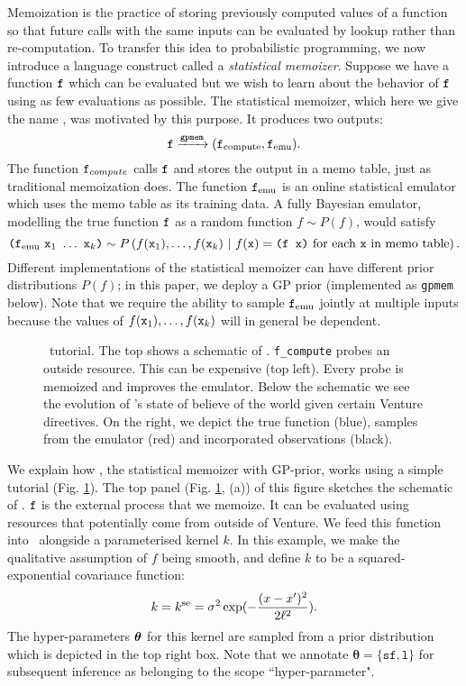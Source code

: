 Memoization is the practice of storing previously computed values of a function so that future calls with the same inputs can be evaluated by lookup rather than re-computation.
To transfer this idea to probabilistic programming, we now introduce a language construct called a
\emph{statistical memoizer}.  Suppose we have a function $\texttt{f}$ which can be evaluated 
but we wish to learn about the behavior of $\texttt{f}$ using as
few evaluations as possible.  The statistical memoizer, which here we give the
name \gpmem, was motivated by this purpose.  It produces two outputs:
\[ \texttt{f} \xrightarrow{\texttt{gpmem}} (\texttt{f}_{\text{compute}}, \texttt{f}_{\textrm{emu}}). \]
The function $\texttt{f}_{compute}$ calls $\texttt{f}$ and stores the output in a memo
table, just as traditional memoization does.  The function $\texttt{f}_{\textrm{emu}}$ is
an online statistical emulator which uses the memo table as its training
data.  A fully Bayesian emulator, modelling the true function $\texttt{f}$ as a
random function $f \sim P(f)$, would satisfy
\[
\texttt{(}\ftt_\emu\ \xtt_1\ \ldots\ \xtt_k\texttt{)}
\sim
P\pn{
  f(\xtt_1), \ldots, f(\xtt_k)
  \mvert
  \text{$f(\xtt) = \texttt{(f x)}$ for each $\xtt$ in memo table}
}.
\]
Different implementations of the statistical memoizer can have
different prior distributions $P(f)$; in this paper, we deploy a \ac{GP} 
prior (implemented as \texttt{gpmem} below).  Note that we require the ability
to sample $\texttt{f}_{\textrm{emu}}$ jointly at multiple inputs because the values of
$f(\texttt{x}_1),\ldots,f(\texttt{x}_k)$ will in general be dependent.


\begin{figure}
\noindent
\captionsetup{aboveskip=-3pt}
\caption{\footnotesize \gpmem\ tutorial. The top shows a schematic of \gpmem.
  \texttt{f\_compute} probes an outside resource.
  This can be expensive (top left).
  Every probe is memoized and improves the emulator. Below the schematic we see the evolution
  of \gpmem's state of believe of the world given certain Venture
  directives. On the right, we depict the true function (blue), samples from the
emulator (red) and incorporated observations (black).}
\label{fig:gpmem_tutorial}
\end{figure}

We explain how \gpmem, the statistical memoizer with \ac{GP}-prior, works using a simple tutorial
(Fig. \ref{fig:gpmem_tutorial}). 
The top panel (Fig. \ref{fig:gpmem_tutorial}, (a)) of this figure sketches the schematic of \gpmem.
$\texttt{f}$ is the external process that we memoize. It can be evaluated using resources that potentially come
from outside of Venture.  
We feed this function into \gpmem\ alongside
a parameterised kernel $k$.  
In this example, we make the qualitative assumption of $f$ being smooth, and define
$k$ to be a squared-exponential covariance function:
\[
k = k^\text{se} = \sigma^2 \exp(-\frac{(x-x^\prime)^2}{2\ell^2}).
\]
The hyper-parameters $\bm{\theta}$ for this kernel are sampled from a 
prior distribution which is depicted in the top right box.
Note that we annotate $\bm{\theta}=\{\texttt{sf},\texttt{l}\}$ for subsequent
inference as belonging to the scope ``hyper-parameter".

